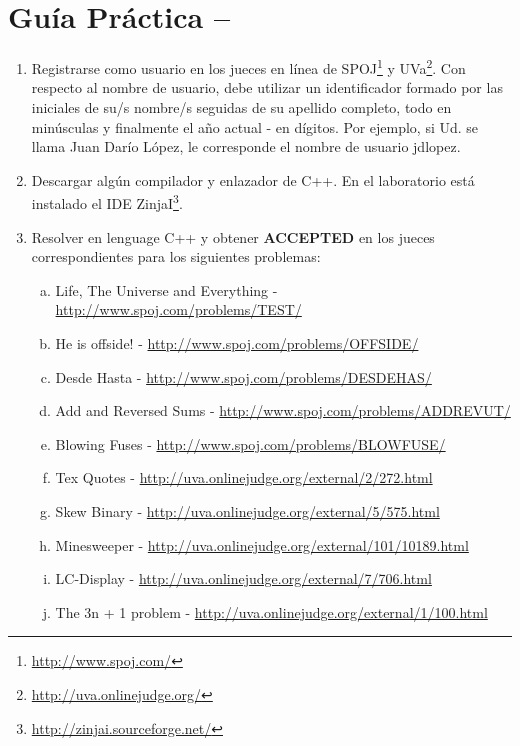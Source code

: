 




\section*{Gu\'ia Pr\'actica \numguia -- \nombreguia}

\begin{enumerate}[1 -]


	\item Registrarse como usuario en los jueces en línea de SPOJ\footnote{\href{http://www.spoj.com/} {http://www.spoj.com/}} y UVa\footnote{\href{http://uva.onlinejudge.org/} {http://uva.onlinejudge.org/}}.
Con respecto al nombre de usuario, debe utilizar un identificador formado por las iniciales de su/s nombre/s seguidas de su apellido completo, todo en minúsculas y finalmente el año actual - en dígitos. Por ejemplo, si Ud. se llama Juan Darío López, le corresponde el nombre de usuario jdlopez\anio.

	\item Descargar alg\'un compilador y enlazador de C++. En el laboratorio est\'a instalado el IDE ZinjaI\footnote{\href{http://zinjai.sourceforge.net/} {http://zinjai.sourceforge.net/}}.
	
	\item Resolver en lenguage C++ y obtener \textbf{ACCEPTED} en los jueces correspondientes para los siguientes problemas:
	
	\begin{enumerate}[a)]
	
		\item Life, The Universe and Everything - \href{http://www.spoj.com/problems/TEST/} {http://www.spoj.com/problems/TEST/}
		\item He is offside! - \href{http://www.spoj.com/problems/OFFSIDE/}{http://www.spoj.com/problems/OFFSIDE/}
		\item Desde Hasta - \href{http://www.spoj.com/problems/DESDEHAS/}{http://www.spoj.com/problems/DESDEHAS/}
		\item Add and Reversed Sums - \href{http://www.spoj.com/problems/ADDREVUT/}{http://www.spoj.com/problems/ADDREVUT/} 
		\item Blowing Fuses - \href{http://www.spoj.com/problems/BLOWFUSE/}{http://www.spoj.com/problems/BLOWFUSE/} 
		\item Tex Quotes - \href{http://uva.onlinejudge.org/external/2/272.html}{http://uva.onlinejudge.org/external/2/272.html} 
		\item Skew Binary - \href{http://uva.onlinejudge.org/external/5/575.html}{http://uva.onlinejudge.org/external/5/575.html}
		\item Minesweeper - \href{http://uva.onlinejudge.org/external/101/10189.html}{http://uva.onlinejudge.org/external/101/10189.html} 	
		\item LC-Display - \href{http://uva.onlinejudge.org/external/7/706.html}{http://uva.onlinejudge.org/external/7/706.html} 	
		\item The 3n + 1 problem - \href{http://uva.onlinejudge.org/external/1/100.html}{http://uva.onlinejudge.org/external/1/100.html} 	
	\end{enumerate}
	

\end{enumerate}

